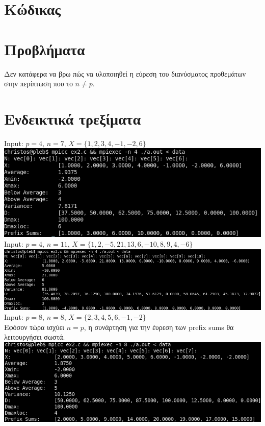 \documentclass{article}
\begin{document}
\section{Κώδικας}


\section{Προβλήματα}

Δεν κατάφερα να βρω πώς να υλοποιηθεί η εύρεση του διανύσματος προθεμάτων
στην περίπτωση που το $n \neq p$.

\section{Ενδεικτικά τρεξίματα}

Input: $p = 4$, $n = 7$, $X = \{1, 2, 3, 4, -1, -2, 6\}$ \\

\includegraphics[width=\textwidth]{res/run1.png} \\

Input: $p = 4$, $n = 11$, $X = \{1, 2, -5, 21, 13, 6, -10, 8, 9, 4, -6\}$ \\

\includegraphics[width=\textwidth]{res/run2.png} \\

Input: $p = 8$, $n = 8$, $X = \{2, 3, 4, 5, 6, -1, -2\}$ \\
Εφόσον τώρα ισχύει $n = p$, η συνάρτηση για την έυρεση των
prefix sums θα λειτουργήσει σωστά. \\

\includegraphics[width=\textwidth]{res/run3.png} \\
\end{document}
